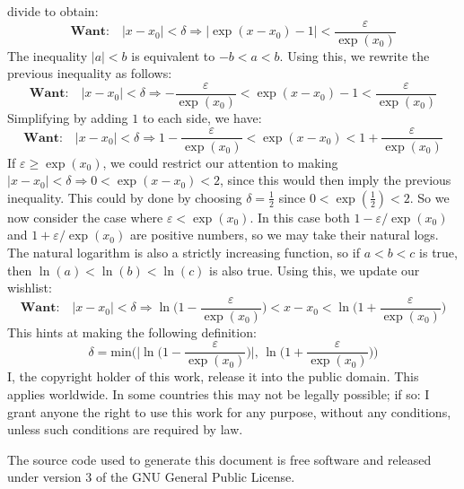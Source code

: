 \documentclass{article}
\theoremstyle{normal}
\theoremstyle{plain}
\begin{document}
    divide to obtain:
    \begin{equation}
        \textbf{Want:}\quad
        |x-x_{0}|<\delta
        \Rightarrow
        \big|\exp(x-x_{0})-1\big|<\frac{\varepsilon}{\exp(x_{0})}
    \end{equation}
    The inequality $|a|<b$ is equivalent to $-b<a<b$. Using this, we rewrite
    the previous inequality as follows:
    \begin{equation}
        \textbf{Want:}\quad
        |x-x_{0}|<\delta
        \Rightarrow
        -\frac{\varepsilon}{\exp(x_{0})}
            <\exp(x-x_{0})-1
            <\frac{\varepsilon}{\exp(x_{0})}
    \end{equation}
    Simplifying by adding $1$ to each side, we have:
    \begin{equation}
        \textbf{Want:}\quad
        |x-x_{0}|<\delta
        \Rightarrow
        1-\frac{\varepsilon}{\exp(x_{0})}
            <\exp(x-x_{0})
            <1+\frac{\varepsilon}{\exp(x_{0})}
    \end{equation}
    If $\varepsilon\geq\exp(x_{0})$, we could restrict our attention to making
    $|x-x_{0}|<\delta\Rightarrow{0}<\exp(x-x_{0})<2$, since this would then
    imply the previous inequality. This could by done by choosing
    $\delta=\frac{1}{2}$ since $0<\exp(\frac{1}{2})<2$. So we now consider the
    case where $\varepsilon<\exp(x_{0})$. In this case both
    $1-\varepsilon/\exp(x_{0})$ and $1+\varepsilon/\exp(x_{0})$ are positive
    numbers, so we may take their natural logs. The natural logarithm is
    also a strictly increasing function, so if $a<b<c$ is true, then
    $\ln(a)<\ln(b)<\ln(c)$ is also true. Using this, we update our wishlist:
    \begin{equation}
        \textbf{Want:}\quad
        |x-x_{0}|<\delta
        \Rightarrow
        \ln\big(1-\frac{\varepsilon}{\exp(x_{0})}\big)
            <x-x_{0}
            <\ln\big(1+\frac{\varepsilon}{\exp(x_{0})}\big)
    \end{equation}
    This hints at making the following definition:
    \begin{equation}
        \delta=\textrm{min}\Big(
            \big|\ln\big(1-\frac{\varepsilon}{\exp(x_{0})}\big)\big|,\,
            \ln\big(1+\frac{\varepsilon}{\exp(x_{0})}\big)
        \Big)
    \end{equation}
    \newpage
    I, the copyright holder of this work, release it into the public domain.
    This applies worldwide. In some countries this may not be legally possible;
    if so: I grant anyone the right to use this work for any purpose, without
    any conditions, unless such conditions are required by law.
    \par\hfill\par
    The source code used to generate this document is free software and released
    under version 3 of the GNU General Public License.
\end{document}
